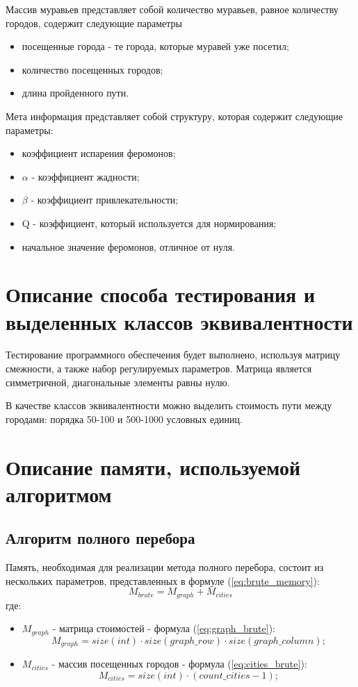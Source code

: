 Массив муравьев представляет собой количество муравьев, равное количеству городов, содержит следующие параметры
\begin{itemize}
	\item посещенные города - те города, которые муравей уже посетил;
	\item количество посещенных городов;
	\item длина пройденного пути.
\end{itemize}

Мета информация представляет собой структуру, которая содержит следующие параметры:
\begin{itemize}
	\item коэффициент испарения феромонов;
	\item $\alpha$ - коэффициент жадности;
	\item $\beta$ - коэффициент привлекательности;
	\item Q - коэффициент, который используется для нормирования;
	\item начальное значение феромонов, отличное от нуля.
\end{itemize}

\section{Описание способа тестирования и выделенных классов эквивалентности}
Тестирование программного обеспечения будет выполнено, используя матрицу смежности, а также набор регулируемых параметров. Матрица является симметричной, диагональные элементы равны нулю.

В качестве классов эквивалентности можно выделить стоимость пути между городами: порядка 50-100 и 500-1000 условных единиц.

\section{Описание памяти, используемой алгоритмом}
\subsection{Алгоритм полного перебора}
	Память, необходимая для реализации метода полного перебора, состоит из нескольких параметров, представленных в формуле (\ref{eq:brute_memory}):
	\begin{equation}
		\label{eq:brute_memory}
		M_{brute} = M_{graph} + M_{cities}
	\end{equation}
	где:
	\begin{itemize}
		\item $M_{graph}$ - матрица стоимостей - формула (\ref{eq:graph_brute}):
		\begin{equation}
			\label{eq:graph_brute}
			M_{graph} = size(int) \cdot size(graph\_row) \cdot size(graph\_column);
		\end{equation}
		\item $M_{cities}$ - массив посещенных городов - формула (\ref{eq:cities_brute}):
		\begin{equation}
			\label{eq:cities_brute}
			M_{cities} = size(int) \cdot (count\_cities - 1);
		\end{equation}
	\end{itemize}

